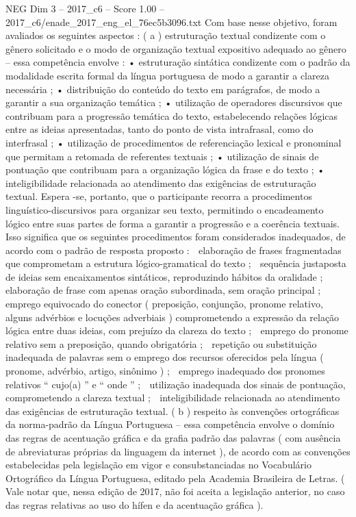 \begin{textsample}{NEG Dim 3 – 2017\_c6 – Score 1.00 – 2017\_c6/enade\_2017\_eng\_el\_76ec5b3096.txt}
Com base nesse objetivo, foram avaliados os seguintes aspectos : ( a ) estruturação textual condizente com o gênero solicitado e o modo de organização textual expositivo adequado ao gênero – essa competência envolve : • estruturação sintática condizente com o padrão da modalidade escrita formal da língua portuguesa de modo a garantir a clareza necessária ; • distribuição do conteúdo do texto em parágrafos, de modo a garantir a sua organização temática ; • utilização de operadores discursivos que contribuam para a progressão temática do texto, estabelecendo relações lógicas entre as ideias apresentadas, tanto do ponto de vista intrafrasal, como do interfrasal ; • utilização de procedimentos de referenciação lexical e pronominal que permitam a retomada de referentes textuais ; • utilização de sinais de pontuação que contribuam para a organização lógica da frase e do texto ; • inteligibilidade relacionada ao atendimento das exigências de estruturação textual.
Espera -se, portanto, que o participante recorra a procedimentos linguístico-discursivos para organizar seu texto, permitindo o encadeamento lógico entre suas partes de forma a garantir a progressão e a coerência textuais.
Isso significa que os seguintes procedimentos foram considerados inadequados, de acordo com o padrão de resposta proposto :  elaboração de frases fragmentadas que comprometam a estrutura lógico-gramatical do texto ;  sequência justaposta de ideias sem encaixamentos sintáticos, reproduzindo hábitos da oralidade ;  elaboração de frase com apenas oração subordinada, sem oração principal ;  emprego equivocado do conector ( preposição, conjunção, pronome relativo, alguns advérbios e locuções adverbiais ) comprometendo a expressão da relação lógica entre duas ideias, com prejuízo da clareza do texto ;  emprego do pronome relativo sem a preposição, quando obrigatória ;  repetição ou substituição inadequada de palavras sem o emprego dos recursos oferecidos pela língua ( pronome, advérbio, artigo, sinônimo ) ;  emprego inadequado dos pronomes relativos “ cujo(a) ” e “ onde ” ;  utilização inadequada dos sinais de pontuação, comprometendo a clareza textual ;  inteligibilidade relacionada ao atendimento das exigências de estruturação textual. ( b ) respeito às convenções ortográficas da norma-padrão da Língua Portuguesa – essa competência envolve o domínio das regras de acentuação gráfica e da grafia padrão das palavras ( com ausência de abreviaturas próprias da linguagem da internet ), de acordo com as convenções estabelecidas pela legislação em vigor e consubstanciadas no Vocabulário Ortográfico da Língua Portuguesa, editado pela Academia Brasileira de Letras. ( Vale notar que, nessa edição de 2017, não foi aceita a legislação anterior, no caso das regras relativas ao uso do hífen e da acentuação gráfica ).

\end{textsample}
